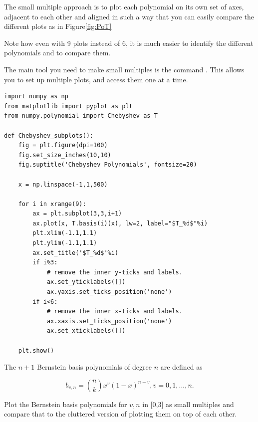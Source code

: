 The small multiple approach is to plot each polynomial on its own set of axes, adjacent to each other and aligned in such a way that you can easily compare the different plots as in Figure\ref{fig:PoT}


Note how even with 9 plots instead of 6, it is much easier to identify the different polynomials and to compare them.

The main tool you need to make small multiples is the command .  This allows you to set up multiple plots, and access them one at a time.

\begin{lstlisting}
import numpy as np
from matplotlib import pyplot as plt
from numpy.polynomial import Chebyshev as T

def Chebyshev_subplots():
    fig = plt.figure(dpi=100)
    fig.set_size_inches(10,10)
    fig.suptitle('Chebyshev Polynomials', fontsize=20)

    x = np.linspace(-1,1,500)

    for i in xrange(9):
        ax = plt.subplot(3,3,i+1)
        ax.plot(x, T.basis(i)(x), lw=2, label="$T_%d$"%i)
        plt.xlim(-1.1,1.1)
        plt.ylim(-1.1,1.1)
        ax.set_title('$T_%d$'%i)
        if i%3:
            # remove the inner y-ticks and labels.
            ax.set_yticklabels([])
            ax.yaxis.set_ticks_position('none')
        if i<6:
            # remove the inner x-ticks and labels.
            ax.xaxis.set_ticks_position('none')
            ax.set_xticklabels([]) 

    plt.show()
\end{lstlisting}


\begin{problem}

The $n+1$ Bernstein basis polynomials of degree $n$ are defined as 

$$b_{v,n} = {{n} \choose {k}} x^v (1-x)^{n-v}, v = 0, 1,..., n.$$


Plot the Bernstein basis polynomials for $v,n$ in [0,3] as small multiples and compare that to the cluttered version of plotting them on top of each other.

\end{problem}

